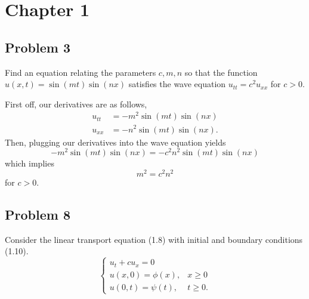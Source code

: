 \documentclass[a4paper,12pt]{article}
\begin{document}
\section*{Chapter 1}
\subsection*{Problem 3}
    Find an equation relating the parameters $c, m, n$ so that the function $u(x, t) = \sin(m t)\sin(n x)$ satisfies the wave equation $u_{tt} = c^2 u_{xx}$ for $ c > 0 $.
    
    First off, our derivatives are as follows,
    \begin{align*}
        u_{tt} &= -m^2 \sin(m t) \sin(n x) \\
        u_{xx} &= -n^2 \sin(m t) \sin(n x).
    \end{align*}
    Then, plugging our derivatives into the wave equation yields
    \[
        -m^2 \sin(m t) \sin(n x) = -c^2 n^2 \sin(m t) \sin(n x)
    \]
    which implies
    \[
        m^2 = c^2 n^2
    \]
    for $ c > 0 $.

\subsection*{Problem 8}
    Consider the linear transport equation (1.8) with initial and boundary conditions (1.10).
    \[
        \begin{cases}
            u_t + c u_x = 0 \\
            u(x, 0) = \phi(x), & x \geq 0 \\
            u(0, t) = \psi(t), & t \geq 0.
        \end{cases}
    \] 
    
\end{document}
